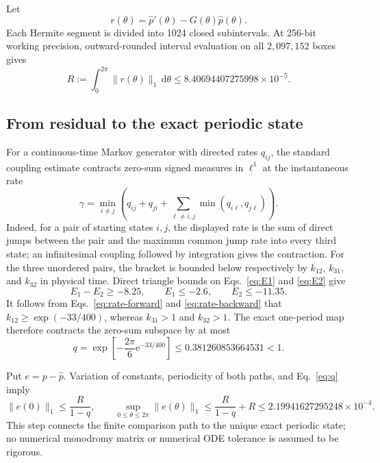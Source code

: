 \documentclass[11pt]{article}
\newcommand{\dd}{\mathrm{d}}
\newcommand{\ee}{\mathrm{e}}
\newcommand{\norm}[1]{\lVert#1\rVert}
\begin{document}
Let
\begin{equation}
 r(\theta)=\widehat p'(\theta)-G(\theta)\widehat p(\theta).
\end{equation}
Each Hermite segment is divided into 1024 closed subintervals.  At 256-bit working
precision, outward-rounded interval evaluation on all \(2{,}097{,}152\) boxes gives
\begin{equation}
 R:=\int_0^{2\pi}\norm{r(\theta)}_1\,\dd\theta
 \leq 8.40694407275998\times10^{-5}.
 \label{eq:R}
\end{equation}

\subsection{From residual to the exact periodic state}

For a continuous-time Markov generator with directed rates \(q_{ij}\), the standard
coupling estimate contracts zero-sum signed measures in \(\ell^1\) at the instantaneous
rate
\begin{equation}
 \gamma=\min_{i\ne j}\left(q_{ij}+q_{ji}
 +\sum_{\ell\ne i,j}\min(q_{i\ell},q_{j\ell})\right).
 \label{eq:dobrushin}
\end{equation}
Indeed, for a pair of starting states \(i,j\), the displayed rate is the sum of
direct jumps between the pair and the maximum common jump rate into every third
state; an infinitesimal coupling followed by integration gives the contraction.
For the three unordered pairs, the bracket is bounded below respectively by
\(k_{12}\), \(k_{31}\), and \(k_{32}\) in physical time.  Direct triangle bounds on
Eqs.~\eqref{eq:E1} and \eqref{eq:E2} give
\begin{equation}
 E_1-E_2\geq-8.25,\qquad E_1\leq-2.6,
 \qquad E_2\leq-11.35.
\end{equation}
It follows from Eqs.~\eqref{eq:rate-forward} and \eqref{eq:rate-backward} that
\(k_{12}\geq\exp(-33/400)\), whereas \(k_{31}>1\) and \(k_{32}>1\).
The exact one-period map therefore contracts the zero-sum subspace by at most
\begin{equation}
 q=\exp\!\left[-\frac{2\pi}{6}\ee^{-33/400}\right]
 \leq0.381260853664531<1.
 \label{eq:q}
\end{equation}

Put \(e=p-\widehat p\).  Variation of constants, periodicity of both paths, and
Eq.~\eqref{eq:q} imply
\begin{equation}
 \norm{e(0)}_1\leq\frac{R}{1-q},\qquad
 \sup_{0\leq\theta\leq2\pi}\norm{e(\theta)}_1
 \leq\frac{R}{1-q}+R
 \leq2.19941627295248\times10^{-4}.
 \label{eq:stateerror}
\end{equation}
This step connects the finite comparison path to the unique exact periodic state; no
numerical monodromy matrix or numerical ODE tolerance is assumed to be rigorous.
\end{document}
